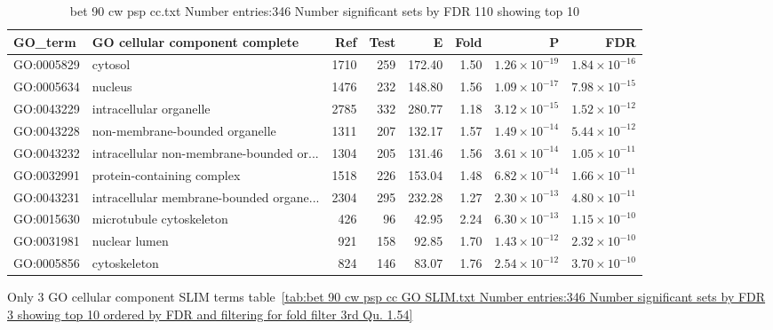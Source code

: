 \begin{table}[ht]
\centering
\begin{tabular}{llrrrrrr}
  \hline
GO\_term & GO cellular component complete & Ref & Test & E & Fold & P & FDR \\ 
  \hline
GO:0005829 & cytosol  & 1710 & 259 & 172.40 & 1.50 & $1.26 \times 10^{-19}$ & $1.84 \times 10^{-16}$ \\ 
  GO:0005634 & nucleus  & 1476 & 232 & 148.80 & 1.56 & $1.09 \times 10^{-17}$ & $7.98 \times 10^{-15}$ \\ 
  GO:0043229 & intracellular organelle  & 2785 & 332 & 280.77 & 1.18 & $3.12 \times 10^{-15}$ & $1.52 \times 10^{-12}$ \\ 
  GO:0043228 & non-membrane-bounded organelle  & 1311 & 207 & 132.17 & 1.57 & $1.49 \times 10^{-14}$ & $5.44 \times 10^{-12}$ \\ 
  GO:0043232 & intracellular non-membrane-bounded or... & 1304 & 205 & 131.46 & 1.56 & $3.61 \times 10^{-14}$ & $1.05 \times 10^{-11}$ \\ 
  GO:0032991 & protein-containing complex  & 1518 & 226 & 153.04 & 1.48 & $6.82 \times 10^{-14}$ & $1.66 \times 10^{-11}$ \\ 
  GO:0043231 & intracellular membrane-bounded organe... & 2304 & 295 & 232.28 & 1.27 & $2.30 \times 10^{-13}$ & $4.80 \times 10^{-11}$ \\ 
  GO:0015630 & microtubule cytoskeleton  & 426 & 96 & 42.95 & 2.24 & $6.30 \times 10^{-13}$ & $1.15 \times 10^{-10}$ \\ 
  GO:0031981 & nuclear lumen  & 921 & 158 & 92.85 & 1.70 & $1.43 \times 10^{-12}$ & $2.32 \times 10^{-10}$ \\ 
  GO:0005856 & cytoskeleton  & 824 & 146 & 83.07 & 1.76 & $2.54 \times 10^{-12}$ & $3.70 \times 10^{-10}$ \\ 
  \hline
\end{tabular}
\caption{bet 90 cw psp cc.txt Number entries:346 Number significant sets by FDR 110 showing top 10} 
\label{tab:bet 90 cw psp cc.txt Number entries:346 Number significant sets by FDR 110 showing top 10}
\end{table}

Only 3 GO cellular component SLIM terms table~\ref{tab:bet 90 cw psp cc GO SLIM.txt Number entries:346 Number significant sets by FDR 3 showing top 10 ordered by FDR and filtering for fold filter 3rd Qu. 1.54}

